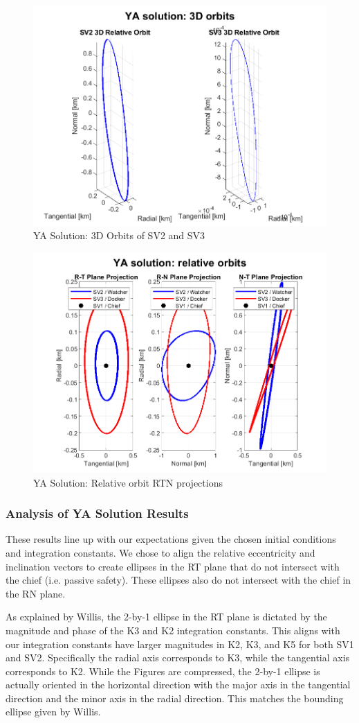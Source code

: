\begin{figure}[H]
    \centering
    \includegraphics[width=0.7\linewidth]{sim/figures/PS3/YA_sol_3D_orbits.png}
    \caption{YA Solution: 3D Orbits of SV2 and SV3}
    \label{fig:YA_sol_3D_orbits}
\end{figure}
\begin{figure}[H]
    \centering
    \includegraphics[width=0.7\linewidth]{sim/figures/PS3/RTN_projections_YA.png}
    \caption{YA Solution: Relative orbit RTN projections}
    \label{fig:YA_sol_RTN}
\end{figure}

\subsubsection{Analysis of YA Solution Results}\label{sec:YA_sol_analysis}
These results line up with our expectations given the chosen initial conditions and integration constants. We chose to align the relative eccentricity and inclination vectors to create ellipses in the RT plane that do not intersect with the chief (i.e. passive safety). These ellipses also do not intersect with the chief in the RN plane. 

As explained by Willis, the 2-by-1 ellipse in the RT plane is dictated by the magnitude and phase of the K3 and K2 integration constants. This aligns with our integration constants have larger magnitudes in K2, K3, and K5 for both SV1 and SV2. Specifically the radial axis corresponds to K3, while the tangential axis corresponds to K2. While the Figures are compressed, the 2-by-1 ellipse is actually oriented in the horizontal direction with the major axis in the tangential direction and the minor axis in the radial direction. This matches the bounding ellipse given by Willis. 

